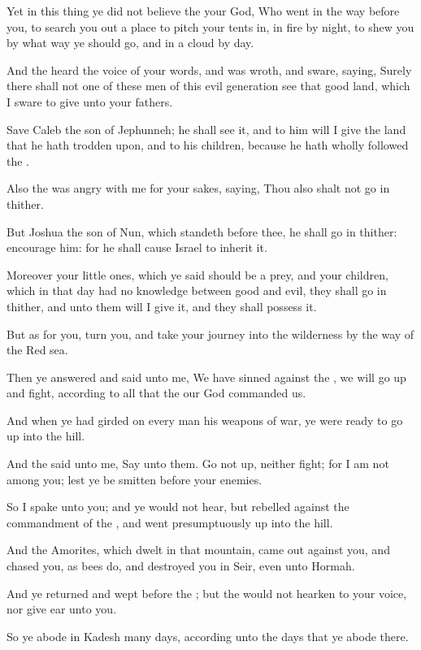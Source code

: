 \Verse Yet in this thing ye did not believe the \LORD your God, \Verse Who went in the way before you, to search you out a place to pitch your tents in, in fire by night, to shew you by what way ye should go, and in a cloud by day.

\Verse And the \LORD heard the voice of your words, and was wroth, and sware, saying, \Verse Surely there shall not one of these men of this evil generation see that good land, which I sware to give unto your fathers.

\Verse Save Caleb the son of Jephunneh; he shall see it, and to him will I give the land that he hath trodden upon, and to his children, because he hath wholly followed the \LORD.

\Verse Also the \LORD was angry with me for your sakes, saying, Thou also shalt not go in thither.

\Verse But Joshua the son of Nun, which standeth before thee, he shall go in thither: encourage him: for he shall cause Israel to inherit it.

\Verse Moreover your little ones, which ye said should be a prey, and your children, which in that day had no knowledge between good and evil, they shall go in thither, and unto them will I give it, and they shall possess it.

\Verse But as for you, turn you, and take your journey into the wilderness by the way of the Red sea.

\Verse Then ye answered and said unto me, We have sinned against the \LORD, we will go up and fight, according to all that the \LORD our God commanded us.

And when ye had girded on every man his weapons of war, ye were ready to go up into the hill.

\Verse And the \LORD said unto me, Say unto them. Go not up, neither fight; for I am not among you; lest ye be smitten before your enemies.

\Verse So I spake unto you; and ye would not hear, but rebelled against the commandment of the \LORD, and went presumptuously up into the hill.

\Verse And the Amorites, which dwelt in that mountain, came out against you, and chased you, as bees do, and destroyed you in Seir, even unto Hormah.

\Verse And ye returned and wept before the \LORD; but the \LORD would not hearken to your voice, nor give ear unto you.

\Verse So ye abode in Kadesh many days, according unto the days that ye abode there.


